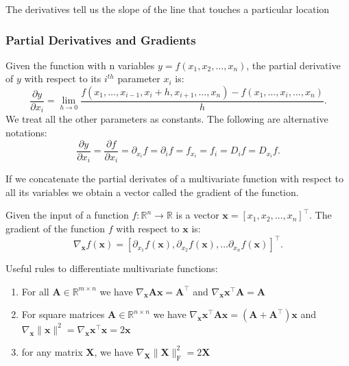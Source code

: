 \documentclass[]{article}
\begin{document}
The derivatives tell us the slope of the line that touches a particular location

\setcounter{subsubsection}{2}

\subsubsection{Partial Derivatives and Gradients}

Given the function with n variables $y = f(x_1, x_2, \ldots, x_n)$, the partial
derivative of $y$ with respect to its $i^{th}$ parameter $x_i$ is:
\begin{equation}
    \frac{\partial y}{\partial x_i} = \lim_{h \rightarrow 0} \frac{f(x_1, \ldots, x_{i-1}, x_i+h, x_{i+1}, \ldots, x_n) - f(x_1, \ldots, x_i, \ldots, x_n)}{h}.
    \tag{2.4.6}
\end{equation}
We treat all the other parameters as constants. The following are alternative notations:
\begin{equation}
    \frac{\partial y}{\partial x_i} = \frac{\partial f}{\partial x_i} = \partial_{x_i} f = \partial_i f = f_{x_i} = f_i = D_i f = D_{x_i} f.
    \tag{2.4.7}
\end{equation}

If we concatenate the partial derivates of a multivariate function with respect to all
its variables we obtain a vector called the gradient of the function.

Given the input of a function $f: \mathbb{R}^n \rightarrow \mathbb{R}$ is a vector
$\mathbf{x} = [x_1, x_2, \ldots, x_n]^\top$. The gradient of the function $f$ with
respect to $\mathbf{x}$ is:
\begin{equation}
    \nabla_{\mathbf{x}} f(\mathbf{x}) = \left[\partial_{x_1} f(\mathbf{x}), \partial_{x_2} f(\mathbf{x}), \ldots
        \partial_{x_n} f(\mathbf{x})\right]^\top. \tag{2.4.8}
\end{equation}

Useful rules to differentiate multivariate functions:
\begin{enumerate}
    \item For all $\mathbf{A} \in \mathbb{R}^{m \times n}$ we have
          $\nabla_{\mathbf{x}} \mathbf{A} \mathbf{x} = \mathbf{A}^\top$ and
          $\nabla_{\mathbf{x}} \mathbf{x}^\top \mathbf{A} = \mathbf{A}$
    \item For square matrices $\mathbf{A} \in \mathbb{R}^{n \times n}$ we have
          $\nabla_{\mathbf{x}} \mathbf{x}^\top \mathbf{A} \mathbf{x} = (\mathbf{A} + \mathbf{A}^\top)\mathbf{x}$
          and $\nabla_{\mathbf{x}} \|\mathbf{x} \|^2 = \nabla_{\mathbf{x}} \mathbf{x}^\top \mathbf{x} = 2\mathbf{x}$
    \item for any matrix $\mathbf{X}$, we have $\nabla_{\mathbf{X}} \|\mathbf{X} \|_\textrm{F}^2 = 2\mathbf{X}$
\end{enumerate}
\end{document}

